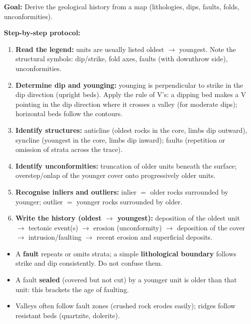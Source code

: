 \documentclass[11pt]{article}
\newcommand{\cle}[1]{{\popxbold\color{popdark}#1}}
\begin{document}
\begin{methode}
\textbf{Goal:} Derive the geological history from a map (lithologies, dips, faults, folds, unconformities).

\textbf{Step-by-step protocol:}
\begin{enumerate}
    \item \textbf{Read the legend:} units are usually listed oldest $\rightarrow$ youngest. Note the structural symbols: dip/strike, fold axes, faults (with downthrow side), unconformities.
    \item \textbf{Determine dip and younging:} younging is perpendicular to strike in the dip direction (upright beds). Apply the \cle{rule of V's}: a dipping bed makes a V pointing in the dip direction where it crosses a valley (for moderate dips); horizontal beds follow the contours.
    \item \textbf{Identify structures:} anticline (oldest rocks in the core, limbs dip outward), syncline (youngest in the core, limbs dip inward); faults (repetition or omission of strata across the trace).
    \item \textbf{Identify unconformities:} \cle{truncation} of older units beneath the surface; \cle{overstep/onlap} of the younger cover onto progressively older units.
    \item \textbf{Recognise inliers and outliers:} inlier $=$ older rocks surrounded by younger; outlier $=$ younger rocks surrounded by older.
    \item \textbf{Write the history (oldest $\rightarrow$ youngest):} deposition of the oldest unit $\rightarrow$ tectonic event(s) $\rightarrow$ erosion (unconformity) $\rightarrow$ deposition of the cover $\rightarrow$ intrusion/faulting $\rightarrow$ recent erosion and superficial deposits.
\end{enumerate}

\begin{attention}
\begin{itemize}
    \item A \textbf{fault} repeats or omits strata; a simple \textbf{lithological boundary} follows strike and dip consistently. Do not confuse them.
    \item A fault \textbf{sealed} (covered but not cut) by a younger unit is older than that unit: this brackets the age of faulting.
    \item Valleys often follow fault zones (crushed rock erodes easily); ridges follow resistant beds (quartzite, dolerite).
\end{itemize}
\end{attention}
\end{methode}
\end{document}
